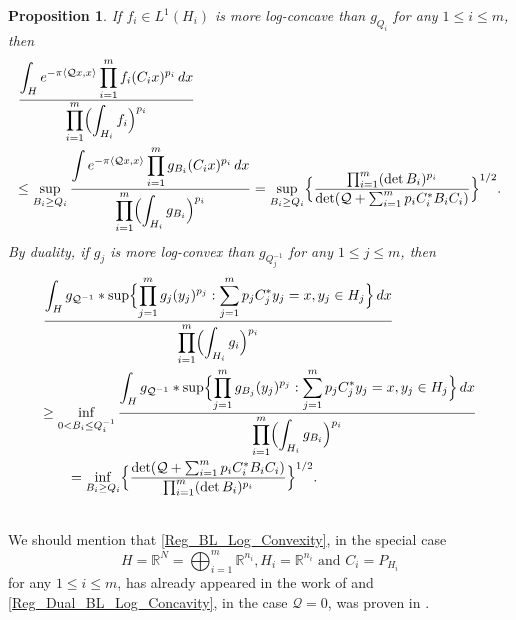 \documentclass[11pt,a4paper,reqno]{amsart}
\numberwithin{equation}{section}
\newtheorem{proposition}[theorem]{Proposition}
\theoremstyle{definition}
\newcommand{\nm}{\noalign{\smallskip}}
\newcommand{\ds}{\displaystyle}
\newcommand{\<}{\ensuremath \leq}
\renewcommand{\>}{\ensuremath \geq}
\begin{document}
\begin{proposition}
    If $f_i \in L^1(H_i)$ is more log-concave than $g_{Q_i}$ for any $1 \leq i \leq m$, then
    \begin{equation} \label{Reg_BL_Log_Concavity} \begin{array}{lll} 
     \frac{\ds \int_H e^{-\pi \langle \mathcal{Q}x,x\rangle} \prod_{i=1}^m f_i(C_ix)^{p_i}\, dx }{\ds \prod_{i=1}^m \Bigl(\int_{H_i}f_i\Bigl)^{p_i}} 
    \\ \nm
    \leq  \ds \sup_{B_i \geq Q_i}\frac{\ds \int e^{-\pi \langle \mathcal{Q}x,x\rangle}\prod_{i=1}^m g_{B_i}(C_ix)^{p_i}\, dx}{\ds \prod_{i=1}^m \Bigl(\int_{H_i}g_{B_i} \Bigl)^{p_i}}=\sup_{B_i \geq Q_i}\Bigl \{ \frac{\prod_{i=1}^m (\det B_i)^{p_i}}{\det(\mathcal{Q}+\sum_{i=1}^m p_iC_i^* B_iC_i)}\Bigl \}^{1/2}. \end{array} \end{equation} By duality, if $g_j$ is more log-convex than $g_{Q_j^{-1}}$ for any $1 \leq j \leq m$, then \begin{equation} \label{Reg_Dual_BL_Log_Convexity} \begin{array}{lll}
    \ds \frac{\ds \int_{H}g_{\mathcal{Q}^{-1}} * \sup \Bigl \{ \prod_{j=1}^m g_j(y_j)^{p_j}: \sum_{j=1}^m p_jC_j^*y_j=x, y_j \in H_j\Bigl \}\, dx}{\ds \prod_{i=1}^m \Bigl( \int_{H_i}g_i\Bigl)^{p_i}} \\ \nm 
    \geq \ds \inf_{0<B_i \leq Q_i^{-1}}\frac{\ds \int_{H}g_{\mathcal{Q}^{-1}} *\sup \Bigl \{ \prod_{j=1}^m g_{B_j}(y_j)^{p_j}: \sum_{j=1}^m p_jC_j^*y_j=x, y_j \in H_j\Bigl \}\, dx}{\ds \prod_{i=1}^m \Bigl( \int_{H_i}g_{B_i}\Bigl)^{p_i}} \\ \nm
    \qquad \ds =\inf_{B_i \geq Q_i} \Bigl \{ \frac{\det(\mathcal{Q}+\sum_{i=1}^m p_i C_i^*B_iC_i)}{\prod_{i=1}^m (\det B_i)^{p_i}}  \Bigl \}^{1/2}. \end{array} \end{equation} 
\end{proposition}

\hfill \\

We should mention that \cref{Reg_BL_Log_Convexity}, in the special case $$H=\mathbb{R}^N=\bigoplus_{i=1}^m \mathbb{R}^{n_i}, H_i=\mathbb{R}^{n_i} \text{ and } C_i=P_{H_i}$$ for any $1 \le i \le m$, has already appeared in the work of \cite{Milman} and \cref{Reg_Dual_BL_Log_Concavity}, in the case $\mathcal Q=0$, was proven in \cite{Vald1}. 


\end{document}
